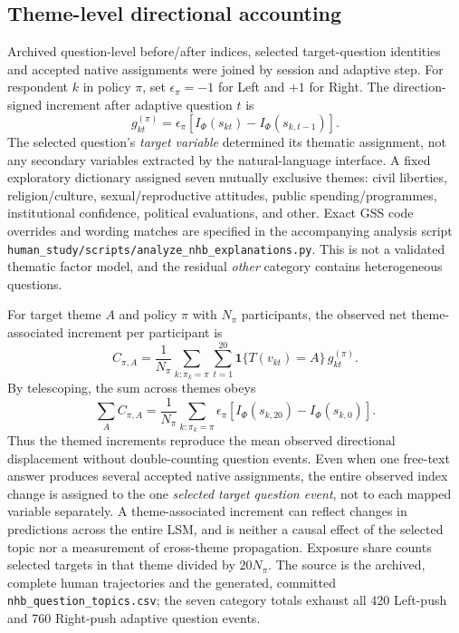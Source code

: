 \documentclass[11pt]{article}
\newcommand{\Ph}{\Phi}
\newcommand{\Iidx}{I_{\Ph}}
\begin{document}
\subsection*{Theme-level directional accounting}
Archived question-level before/after indices, selected target-question identities and accepted native assignments were joined by session and adaptive step. For respondent $k$ in policy $\pi$, set $\epsilon_\pi=-1$ for Left and $+1$ for Right. The direction-signed increment after adaptive question $t$ is
\begin{equation}
g_{kt}^{(\pi)}=\epsilon_\pi\left[\Iidx(s_{kt})-\Iidx(s_{k,t-1})\right].
\end{equation}
The selected question's \emph{target variable} determined its thematic assignment, not any secondary variables extracted by the natural-language interface. A fixed exploratory dictionary assigned seven mutually exclusive themes: civil liberties, religion/culture, sexual/reproductive attitudes, public spending/programmes, institutional confidence, political evaluations, and other. Exact GSS code overrides and wording matches are specified in the accompanying analysis script \texttt{human\_study/scripts/analyze\_nhb\_explanations.py}. This is not a validated thematic factor model, and the residual \emph{other} category contains heterogeneous questions.

For target theme $A$ and policy $\pi$ with $N_\pi$ participants, the observed net theme-associated increment per participant is
\begin{equation}
C_{\pi,A}=\frac{1}{N_\pi}\sum_{k:\pi_k=\pi}
\sum_{t=1}^{20}\mathbf{1}\{T(v_{kt})=A\}\,g_{kt}^{(\pi)}.
\end{equation}
By telescoping, the sum across themes obeys
\begin{equation}
\sum_A C_{\pi,A}=\frac1{N_\pi}\sum_{k:\pi_k=\pi}
\epsilon_\pi\left[\Iidx(s_{k,20})-\Iidx(s_{k,0})\right].
\end{equation}
Thus the themed increments reproduce the mean observed directional displacement without double-counting question events. Even when one free-text answer produces several accepted native assignments, the entire observed index change is assigned to the one \emph{selected target question event}, not to each mapped variable separately. A theme-associated increment can reflect changes in predictions across the entire LSM, and is neither a causal effect of the selected topic nor a measurement of cross-theme propagation. Exposure share counts selected targets in that theme divided by $20N_\pi$. The source is the archived, complete human trajectories and the generated, committed \texttt{nhb\_question\_topics.csv}; the seven category totals exhaust all 420 Left-push and 760 Right-push adaptive question events.
\end{document}
